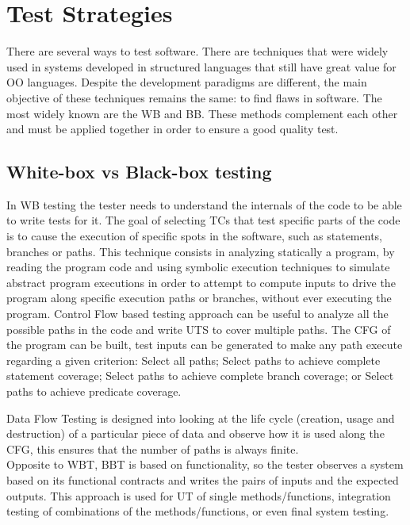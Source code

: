 {\section{Test Strategies}
There are several ways to test software. There are techniques that were widely used in systems developed in structured languages
that still have great value for \ac{OO} languages. Despite the
development paradigms are different,
the main objective of these techniques remains the same: to find flaws in software\cite{Myers:2004:AST:983238}.
The most widely known are the \ac{WB} and \ac{BB}.
These methods complement each other and must be applied together in order to ensure a good quality test.
\subsection{White-box vs Black-box testing}
}
In \ac{WB} testing the tester needs to understand the internals of
the code to be able to write tests for it.
The goal of selecting \ac{TC}s that test specific parts of the code
is to cause the execution of specific spots in the software, such as
statements, branches or paths.
This technique consists in analyzing statically a program, by reading
the program code and using symbolic execution techniques to simulate
abstract program
executions in order to attempt to compute inputs to drive the program
along specific execution paths or branches, without ever executing the
program. Control Flow based testing approach can be useful to analyze all the
possible paths in the code and write \ac{UTS} to cover multiple paths.
The \ac{CFG} of the program can be built,
test inputs can be generated to make any path execute regarding a given criterion:
Select all paths;
Select paths to achieve complete statement
coverage\cite{stt,Ntafos:1988:CST:630792.631017};
Select paths to achieve complete branch coverage\cite{Roper1994,stt};
or Select paths to achieve predicate
coverage\cite{stt,Ntafos:1988:CST:630792.631017}.

Data Flow Testing is designed into looking at the life cycle
(creation, usage and destruction) of a particular
piece of data and observe how it is used along the \ac{CFG}, this ensures
that the number of paths is always finite\cite{dataflow}.\\

Opposite to \ac{WBT}, \ac{BBT} is based on
functionality, so the tester observes a system based
on its functional contracts and writes the pairs of inputs and the
expected outputs.
This approach is used for \ac{UT} of single methods/functions,
integration testing
of combinations of the methods/functions, or even final system testing.\\


